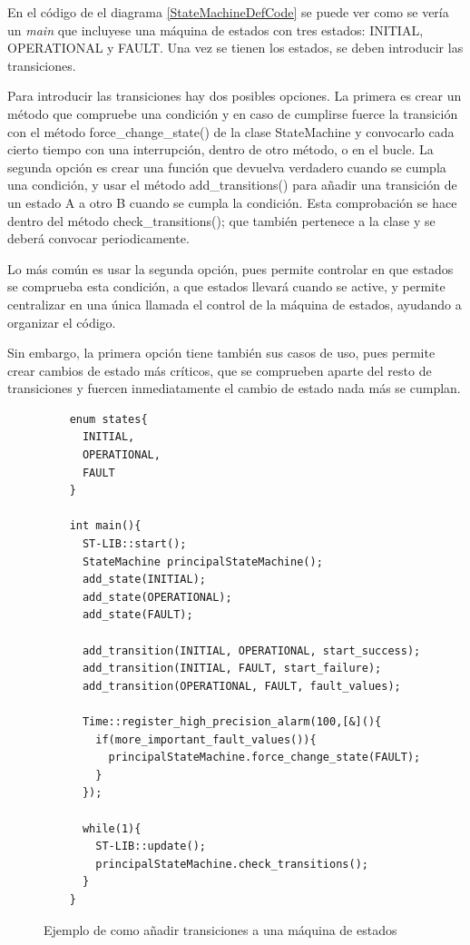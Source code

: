 \documentclass{report}
\begin{document}
En el código de el diagrama \ref{StateMachineDefCode} se puede ver como se vería un \textit{main} que incluyese una máquina de estados con tres estados: INITIAL, OPERATIONAL y FAULT. Una vez se tienen los estados, se deben introducir las transiciones. 
\par \vspace{0.3cm}
Para introducir las transiciones hay dos posibles opciones. La primera es crear un método que compruebe una condición y en caso de cumplirse fuerce la transición con el método force\_change\_state() de la clase StateMachine y convocarlo cada cierto tiempo con una interrupción, dentro de otro método, o en el bucle. La segunda opción es crear una función que devuelva verdadero cuando se cumpla una condición, y usar el método add\_transitions() para añadir una transición de un estado A a otro B cuando se cumpla la condición. Esta comprobación se hace dentro del método check\_transitions(); que también pertenece a la clase y se deberá convocar periodicamente. 
\par \vspace{0.3cm}
Lo más común es usar la segunda opción, pues permite controlar en que estados se comprueba esta condición, a que estados llevará cuando se active, y permite centralizar en una única llamada el control de la máquina de estados, ayudando a organizar el código. \par 
Sin embargo, la primera opción tiene también sus casos de uso, pues permite crear cambios de estado más críticos, que se comprueben aparte del resto de transiciones y fuercen inmediatamente el cambio de estado nada más se cumplan.

\begin{figure}[h]
  \begin{lstlisting}
    enum states{
      INITIAL,
      OPERATIONAL,
      FAULT
    }

    int main(){
      ST-LIB::start();
      StateMachine principalStateMachine();
      add_state(INITIAL);
      add_state(OPERATIONAL);
      add_state(FAULT);

      add_transition(INITIAL, OPERATIONAL, start_success);
      add_transition(INITIAL, FAULT, start_failure);
      add_transition(OPERATIONAL, FAULT, fault_values);

      Time::register_high_precision_alarm(100,[&](){
        if(more_important_fault_values()){
          principalStateMachine.force_change_state(FAULT);
        }
      });

      while(1){
        ST-LIB::update();
        principalStateMachine.check_transitions();
      }
    }
  \end{lstlisting}
  \caption{Ejemplo de como añadir transiciones a una máquina de estados}
  \label{StateMachineTransitionCode}
\end{figure}
\par \vspace{0.3cm}
\end{document}
